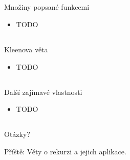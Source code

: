 \documentclass{beamer}
\begin{document}
\subsection{}
\begin{frame}{Množiny popsané funkcemi}
\begin{itemize}
\item TODO
\end{itemize}
\end{frame}

\subsection{}
\begin{frame}{Kleenova věta}
\begin{itemize}
\item TODO
\end{itemize}
\end{frame}

\subsection{}
\begin{frame}{Další zajímavé vlastnosti}
\begin{itemize}
\item TODO
\end{itemize}
\end{frame}

\subsection{}
\begin{frame}{Otázky?}
\begin{center}
Příště: Věty o rekurzi a jejich aplikace.
\end{center}
\end{frame}

\subsection{}
\end{document}
